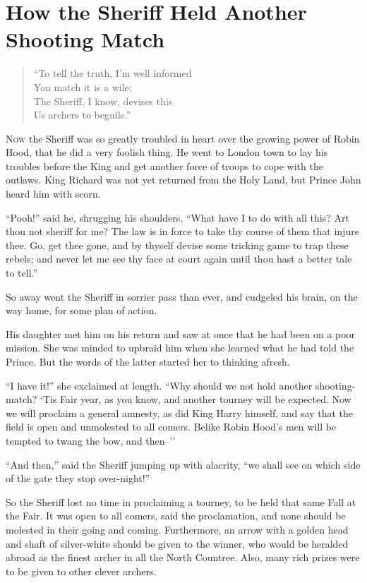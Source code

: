 \chapter{How the Sheriff Held Another Shooting Match}

\begin{quote}
“To tell the truth, I’m well informed\\
Yon match it is a wile;\\
The Sheriff, I know, devises this\\
Us archers to beguile.”
\end{quote}

\lettrine{N}{ow} the Sheriff was so greatly troubled in heart over the
growing power of Robin Hood, that he did a very foolish thing. He went to
London town to lay his troubles before the King and get another force of
troops to cope with the outlaws. King Richard was not yet returned from
the Holy Land, but Prince John heard him with scorn.

``Pooh!'' said he, shrugging his shoulders. ``What have I to do with all
this? Art thou not sheriff for me? The law is in force to take thy
course of them that injure thee. Go, get thee gone, and by thyself
devise some tricking game to trap these rebels; and never let me see thy
face at court again until thou hast a better tale to tell.''

So away went the Sheriff in sorrier pass than ever, and cudgeled his
brain, on the way home, for some plan of action.

His daughter met him on his return and saw at once that he had been on a
poor mission. She was minded to upbraid him when she learned what he had
told the Prince. But the words of the latter started her to thinking
afresh.

``I have it!'' she exclaimed at length. ``Why should we not hold another
shooting-match? `Tis Fair year, as you know, and another tourney will be
expected. Now we will proclaim a general amnesty, as did King Harry
himself, and say that the field is open and unmolested to all comers.
Belike Robin Hood's men will be tempted to twang the bow, and then--''

``And then,'' said the Sheriff jumping up with alacrity, ``we shall see
on which side of the gate they stop over-night!''

So the Sheriff lost no time in proclaiming a tourney, to be held that
same Fall at the Fair. It was open to all comers, said the proclamation,
and none should be molested in their going and coming. Furthermore, an
arrow with a golden head and shaft of silver-white should be given to
the winner, who would be heralded abroad as the finest archer in all the
North Countree. Also, many rich prizes were to be given to other clever
archers.

